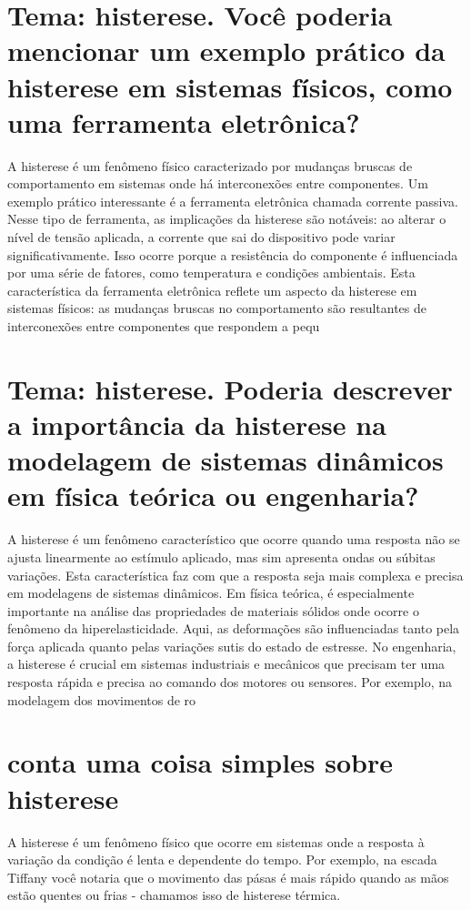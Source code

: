 \documentclass[11pt,a4paper]{article}
\begin{document}
\section{Tema: histerese. Você poderia mencionar um exemplo prático da histerese em sistemas físicos, como uma ferramenta eletrônica?}
A histerese é um fenômeno físico caracterizado por mudanças bruscas de comportamento em sistemas onde há interconexões entre componentes. Um exemplo prático interessante é a ferramenta eletrônica chamada corrente passiva. Nesse tipo de ferramenta, as implicações da histerese são notáveis: ao alterar o nível de tensão aplicada, a corrente que sai do dispositivo pode variar significativamente. Isso ocorre porque a resistência do componente é influenciada por uma série de fatores, como temperatura e condições ambientais. Esta característica da ferramenta eletrônica reflete um aspecto da histerese em sistemas físicos: as mudanças bruscas no comportamento são resultantes de interconexões entre componentes que respondem a pequ

\section{Tema: histerese. Poderia descrever a importância da histerese na modelagem de sistemas dinâmicos em física teórica ou engenharia?}
A histerese é um fenômeno característico que ocorre quando uma resposta não se ajusta linearmente ao estímulo aplicado, mas sim apresenta ondas ou súbitas variações. Esta característica faz com que a resposta seja mais complexa e precisa em modelagens de sistemas dinâmicos. Em física teórica, é especialmente importante na análise das propriedades de materiais sólidos onde ocorre o fenômeno da hiperelasticidade. Aqui, as deformações são influenciadas tanto pela força aplicada quanto pelas variações sutis do estado de estresse. No engenharia, a histerese é crucial em sistemas industriais e mecânicos que precisam ter uma resposta rápida e precisa ao comando dos motores ou sensores. Por exemplo, na modelagem dos movimentos de ro

\section{conta uma coisa simples sobre histerese}
A histerese é um fenômeno físico que ocorre em sistemas onde a resposta à variação da condição é lenta e dependente do tempo. Por exemplo, na escada Tiffany você notaria que o movimento das pásas é mais rápido quando as mãos estão quentes ou frias - chamamos isso de histerese térmica.
\end{document}
